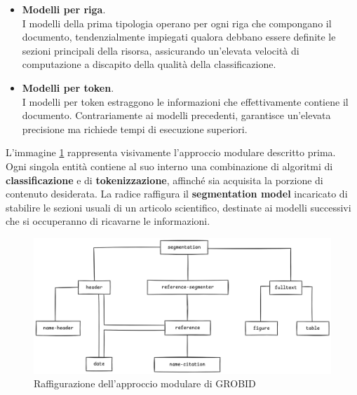\begin{itemize}
    \renewcommand{\labelitemi}{-}
    \item \textbf{Modelli per riga}. \\
    I modelli della prima tipologia operano per ogni riga che compongano il documento, tendenzialmente impiegati qualora debbano essere definite le sezioni principali della risorsa, assicurando un'elevata velocità di computazione a discapito della qualità della classificazione.
    \item \textbf{Modelli per token}. \\
    I modelli per token estraggono le informazioni che effettivamente contiene il documento. Contrariamente ai modelli precedenti, garantisce un'elevata precisione ma richiede tempi di esecuzione superiori.
\end{itemize}
L'immagine \ref{fig:2.2.2-2.1} rappresenta visivamente l'approccio modulare descritto prima. Ogni singola entità contiene al suo interno una combinazione di algoritmi di \textbf{classificazione} e di \textbf{tokenizzazione}, affinché sia acquisita la porzione di contenuto desiderata. La radice raffigura il \textbf{segmentation model} incaricato di stabilire le sezioni usuali di un articolo scientifico, destinate ai modelli successivi che si occuperanno di ricavarne le informazioni.
\begin{figure}[H]
    \centering
    \includegraphics[width=.9\linewidth]{img/img2.png}
    \caption{Raffigurazione dell'approccio modulare di GROBID}
    \label{fig:2.2.2-2.1}
\end{figure} 